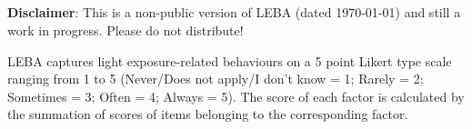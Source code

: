 \clearpage
\makeatletter
\efloat@restorefloats
\makeatother


\begin{appendix}
\section{}
\textbf{Disclaimer}: This is a non-public version of LEBA (dated \today)
and still a work in progress. Please do not distribute!

LEBA captures light exposure-related behaviours on a 5 point Likert type
scale ranging from 1 to 5 (Never/Does not apply/I don't know = 1; Rarely
= 2; Sometimes = 3; Often = 4; Always = 5). The score of each factor is
calculated by the summation of scores of items belonging to the
corresponding factor.

\newpage


\end{appendix}
